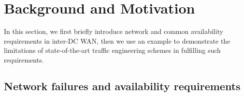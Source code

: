 \documentclass[sigconf]{acmart}
\begin{document}

\section{Background and Motivation}\label{background}
In this section, we first briefly introduce network and common availability requirements in inter-DC WAN, then 
we use an example to demonstrate the limitations of state-of-the-art traffic engineering schemes in fulfilling such requirements.

\subsection{Network failures and availability requirements}

\end{document}
